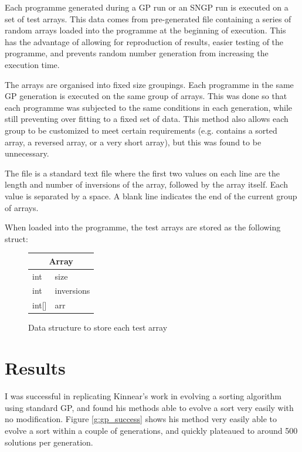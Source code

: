 \documentclass{article}
\begin{document}
        Each programme generated during a GP run or an SNGP run is executed on a set of test arrays. This data comes from pre-generated file containing a series of random arrays loaded into the programme at the beginning of execution. This has the advantage of allowing for reproduction of results, easier testing of the programme, and prevents random number generation from increasing the execution time.
        
        The arrays are organised into fixed size groupings. Each programme in the same GP generation is executed on the same group of arrays. This was done so that each programme was subjected to the same conditions in each generation, while still preventing over fitting to a fixed set of data. This method also allows each group to be customized to meet certain requirements (e.g. contains a sorted array, a reversed array, or a very short array), but this was found to be unnecessary.
        
        The file is a standard text file where the first two values on each line are the length and number of inversions of the array, followed by the array itself. Each value is separated by a space. A blank line indicates the end of the current group of arrays.
        
        When loaded into the programme, the test arrays are stored as the following struct:
        
        \begin{figure}[h]
            \centering
            \begin{tabular}{|l l|}
                \hline
                \multicolumn{2}{|c|}{Array}\\
                \hline
                int & size \\
                int & inversions\\
                int[] & arr\\
                \hline
            \end{tabular}
            \caption{Data structure to store each test array}
            
            \label{struct:array}
        \end{figure}

    \section{Results}

        I was successful in replicating Kinnear's work in evolving a sorting algorithm using standard GP, and found his methods able to evolve a sort very easily with no modification. Figure \ref{g:gp_success} shows his method very easily able to evolve a sort within a couple of generations, and quickly plateaued to around 500 solutions per generation.
        
\end{document}
